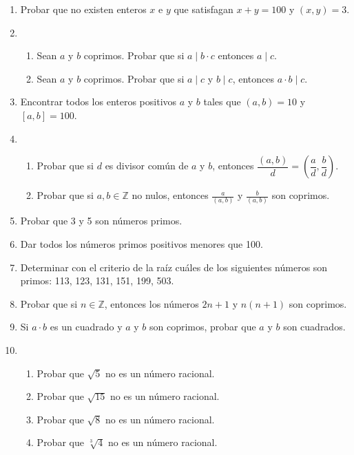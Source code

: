 \documentclass[a4paper,12pt,twoside,spanish,reqno]{amsbook}
\numberwithin{equation}{section}
\begin{document}
\begin{enumerate}
\item Probar que no existen enteros $x$ e $y$ que satisfagan $x+y=100$ y $(x,y)=3$.


\item %
\begin{enumerate}
 \item Sean $a$ y $b$ coprimos. Probar que si $a\mid b\cdot c$ entonces $a \mid c$.
 \item Sean $a$ y $b$ coprimos. Probar que si $a \mid c$ y $b \mid c$, entonces $a\cdot b \mid c$.

\end{enumerate}



\item Encontrar todos los enteros positivos $a$ y $b$ tales que $(a,b)=10$ y $[a,b]=100$.


\item
\begin{enumerate}
\item Probar que si $d$ es divisor común de $a$ y $b$, entonces $\dfrac{(a,b)}{d} = \left(\dfrac{a}{d}, \dfrac{b}{d}\right)$.
\item Probar que si $a,b\in \mathbb Z$ no nulos, entonces  $\displaystyle \frac a{(a,b)}$ y $\displaystyle \frac b{(a,b)}$ son coprimos.
\end{enumerate}


\item Probar que 3  y 5 son números primos.


\item  Dar todos los números primos positivos menores que 100.


\item Determinar con el criterio de la raíz  cuáles de los siguientes números son primos: 113, 123, 131, 151, 199, 503.


\item Probar que si $n \in {\mathbb Z}$, entonces los números $2n+1$ y $n(n+1)$ son coprimos.

\item Si $a\cdot b$ es un cuadrado y $a$ y $b$ son coprimos, probar que $a$ y $b$ son cuadrados.


\item 
\begin{enumerate}
    \item Probar  que $\sqrt{5}$ no es un número racional.   
    \item Probar  que $\sqrt{15}$ no es un número racional.  
    \item Probar  que $\sqrt{8}$ no es un número racional.  
    \item Probar  que $\sqrt[3]{4}$ no es un número racional.
\end{enumerate}


\end{enumerate}
\end{document}
